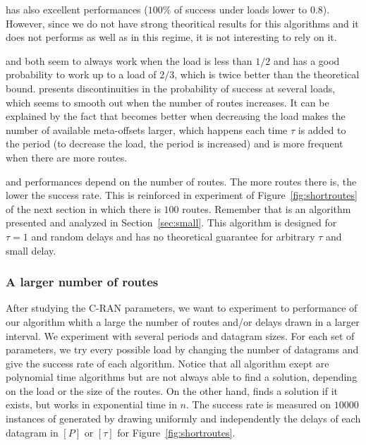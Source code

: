        \firstfit has also excellent performances ($100\%$ of success under loads lower to $0.8$). However, since we do not have strong theoritical results for this algorithms and it does not performs as well as \shortestlongest in this regime, it is not interesting to rely on it.

      \metaoffset and \greedyuniform both seem to always work when the load is less than $1/2$ and has a good probability to work up to a load of $2/3$, which is twice better than the theoretical bound. \metaoffset presents discontinuities in the probability of success at several loads, which seems to smooth out when the number of routes increases. It can be explained by the fact that \metaoffset becomes better when decreasing the load makes the number of available meta-offsets larger, which happens each time $\tau$ is added to the period (to decrease the load, the period is increased) and is more frequent when there are more routes.
      
      \greedyuniform and \metaoffset performances depend on the number of routes. The more routes there is, the lower the success rate. This is reinforced in experiment of Figure~\ref{fig:shortroutes} of the next section in which there is $100$ routes. Remember that \greedyuniform is an algorithm presented and analyzed in Section~\ref{sec:small}. This algorithm is designed for $\tau = 1$ and random delays and has no theoretical guarantee for arbitrary $\tau$ and small delay.
     



\subsubsection{A larger number of routes}\label{sec:pazlmanyroutes} 

After studying the C-RAN parameters, we want to experiment to performance of our algorithm whith a large the number of routes and/or delays drawn in a larger interval.
We experiment with several periods and datagram sizes. For each set of parameters, we try every possible load by changing the number of datagrams and give the success rate of each algorithm. Notice that all algorithm exept \ESCA are polynomial time algorithms but are not always able to find a solution, depending on the load or the size of the routes. On the other hand, \ESCA finds a solution if it exists, but works in exponential time in $n$.
 The success rate is measured on $10000$ instances of \pma generated by drawing uniformly and independently the delays of each datagram in $[P]$ or $[\tau]$ for Figure~\ref{fig:shortroutes}. 


